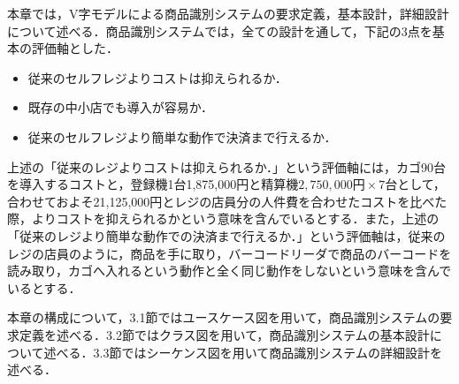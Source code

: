 

本章では，V字モデルによる商品識別システムの要求定義，基本設計，詳細設計について述べる．商品識別システムでは，全ての設計を通して，下記の3点を基本の評価軸とした．

\begin{itemize}
\item 従来のセルフレジよりコストは抑えられるか．
\item 既存の中小店でも導入が容易か．
\item 従来のセルフレジより簡単な動作で決済まで行えるか．
\end{itemize}


上述の「従来のレジよりコストは抑えられるか．」という評価軸には，カゴ90台を導入するコストと，登録機1台1,875,000円と精算機$2,750,000円\times7台$として，合わせておよそ21,125,000円\cite{super}とレジの店員分の人件費を合わせたコストを比べた際，よりコストを抑えられるかという意味を含んでいるとする．また，上述の「従来のレジより簡単な動作での決済まで行えるか．」という評価軸は，従来のレジの店員のように，商品を手に取り，バーコードリーダで商品のバーコードを読み取り，カゴへ入れるという動作と全く同じ動作をしないという意味を含んでいるとする．


本章の構成について，3.1節ではユースケース図を用いて，商品識別システムの要求定義を述べる．3.2節ではクラス図を用いて，商品識別システムの基本設計について述べる．3.3節ではシーケンス図を用いて商品識別システムの詳細設計を述べる．